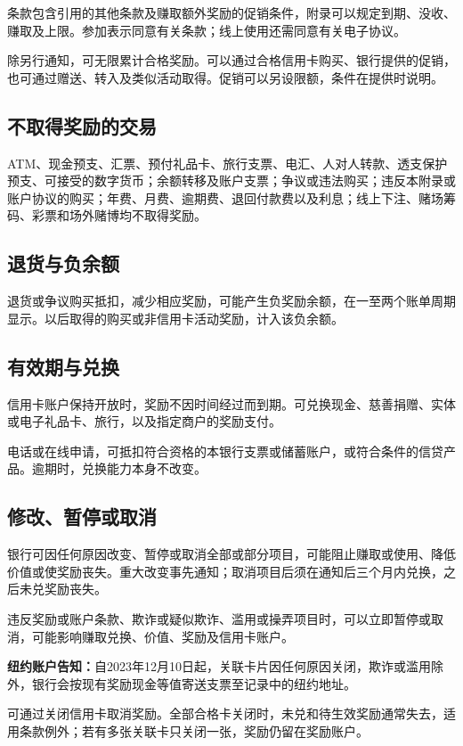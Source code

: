 \documentclass[UTF8,fontset=none,11pt,a4paper]{ctexart}
\begin{document}
条款包含引用的其他条款及赚取额外奖励的促销条件，附录可以规定到期、没收、赚取及上限。参加表示同意有关条款；线上使用还需同意有关电子协议。


除另行通知，可无限累计合格奖励。可以通过合格信用卡购买、银行提供的促销，也可通过赠送、转入及类似活动取得。促销可以另设限额，条件在提供时说明。


\subsection*{不取得奖励的交易}
ATM、现金预支、汇票、预付礼品卡、旅行支票、电汇、人对人转款、透支保护预支、可接受的数字货币；余额转移及账户支票；争议或违法购买；违反本附录或账户协议的购买；年费、月费、逾期费、退回付款费以及利息；线上下注、赌场筹码、彩票和场外赌博均不取得奖励。


\subsection*{退货与负余额}
退货或争议购买抵扣，减少相应奖励，可能产生负奖励余额，在一至两个账单周期显示。以后取得的购买或非信用卡活动奖励，计入该负余额。


\subsection*{有效期与兑换}
信用卡账户保持开放时，奖励不因时间经过而到期。可兑换现金、慈善捐赠、实体或电子礼品卡、旅行，以及指定商户的奖励支付。


电话或在线申请，可抵扣符合资格的本银行支票或储蓄账户，或符合条件的信贷产品。逾期时，兑换能力本身不改变。


\subsection*{修改、暂停或取消}
银行可因任何原因改变、暂停或取消全部或部分项目，可能阻止赚取或使用、降低价值或使奖励丧失。重大改变事先通知；取消项目后须在通知后三个月内兑换，之后未兑奖励丧失。


违反奖励或账户条款、欺诈或疑似欺诈、滥用或操弄项目时，可以立即暂停或取消，可能影响赚取兑换、价值、奖励及信用卡账户。


\textbf{纽约账户告知：}自2023年12月10日起，关联卡片因任何原因关闭，欺诈或滥用除外，银行会按现有奖励现金等值寄送支票至记录中的纽约地址。


可通过关闭信用卡取消奖励。全部合格卡关闭时，未兑和待生效奖励通常失去，适用条款例外；若有多张关联卡只关闭一张，奖励仍留在奖励账户。
\end{document}
